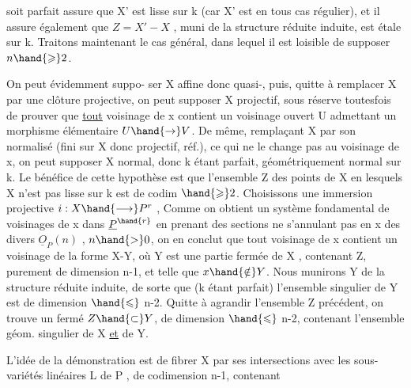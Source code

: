 
 soit parfait assure que X' est lisse sur k (car X' est en tous cas
régulier), et il assure également que $Z = X' - X$ , muni de la structure
réduite induite, est étale sur k. Traitons maintenant le cas général,
dans lequel il est loisible de supposer $n \hand{\geqslant} 2$.

 On peut évidemment suppo-%
ser X  affine donc quasi-, puis, quitte à remplacer X
par une clôture projective, on peut supposer X projectif, sous réserve
toutesfois de prouver que \uline{tout} voisinage de x contient un voisinage
ouvert U admettant un morphisme élémentaire $U \hand{\to} V$. De même, remplaçant
X par son normalisé (fini sur X donc projectif, réf.), ce qui ne le
change pas au voisinage de x, on peut supposer X normal, donc k étant
parfait, géométriquement normal sur k.  Le
bénéfice de cette hypothèse est que l'ensemble Z des points de X en
lesquels X n'est pas lisse sur k est de codim $\hand{\geqslant} 2$. 
Choisissons une immersion projective $i : X \hand{\longrightarrow} P^r$ , 
 Comme on obtient un système
fondamental de voisinages de x dans $\underline{P}^{\hand{r}}$ en prenant des sections ne
s'annulant pas en x des divers $\underline{O}_P(n)$ , $n \hand{>} 0$, on en conclut que tout
voisinage de x contient un voisinage de la forme X-Y, où Y est une
partie fermée de X , contenant Z, purement de dimension n-1, et telle que
$x \hand{\notin} Y$. Nous munirons Y de la structure réduite induite, de sorte que
(k étant parfait) l'ensemble singulier de Y est de dimension $\hand{\leqslant}$ n-2. \placedmargin{\unsure{$\nearrow$}}
Quitte à agrandir l'ensemble Z précédent, on trouve un fermé $Z \hand{\subset} Y$, de
dimension $\hand{\leqslant}$ n-2, contenant l'ensemble géom. singulier de X \uline{et} de Y.

L'idée de la démonstration est de fibrer X par ses intersections
avec les sous-variétés linéaires L de P , de codimension n-1, contenant

